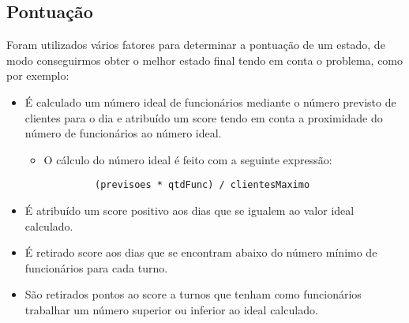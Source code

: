 \bigskip
\subsection*{\bf Pontuação}

 Foram utilizados vários fatores para determinar a pontuação de um estado, de modo conseguirmos obter o melhor estado final tendo em conta o problema, como por exemplo:
 
 
 \begin{itemize}
     \item É calculado um número ideal de funcionários mediante o número previsto de clientes para o dia e atribuído um score tendo em conta a proximidade do número de funcionários ao número ideal.
     \begin{itemize}
         \item O cálculo do número ideal é feito com a seguinte expressão:
         \begin{lstlisting}
         (previsoes * qtdFunc) / clientesMaximo
         \end{lstlisting}
           
     \end{itemize}
     \item É atribuído um score positivo aos dias que se igualem ao valor ideal calculado.
     \item É retirado score aos dias que se encontram abaixo do número mínimo de funcionários para cada turno.
     \item São retirados pontos ao score a turnos que tenham como funcionários trabalhar um número superior ou inferior ao ideal calculado.
 \end{itemize}
 
 

